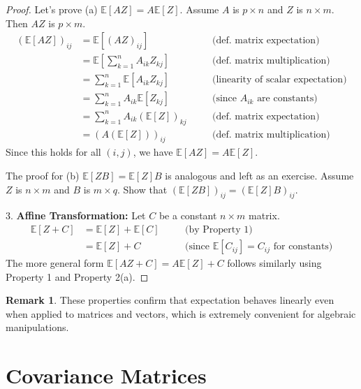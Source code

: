 \documentclass[11pt]{article}
\theoremstyle{definition}
\newtheorem{remark}[theorem]{Remark}
\newcommand{\E}{\mathbb{E}}
\begin{document}
\begin{proof}
    Let's prove (a) $\E[AZ] = A\E[Z]$. Assume $A$ is $p \times n$ and $Z$ is $n \times m$. Then $AZ$ is $p \times m$.
    \begin{align*}
        (\E[AZ])_{ij} &= \E[(AZ)_{ij}] \quad &&\text{(def. matrix expectation)} \\
                      &= \E\left[ \sum_{k=1}^n A_{ik} Z_{kj} \right] \quad &&\text{(def. matrix multiplication)} \\
                      &= \sum_{k=1}^n \E[A_{ik} Z_{kj}] \quad &&\text{(linearity of scalar expectation)} \\
                      &= \sum_{k=1}^n A_{ik} \E[Z_{kj}] \quad &&\text{(since $A_{ik}$ are constants)} \\
                      &= \sum_{k=1}^n A_{ik} (\E[Z])_{kj} \quad &&\text{(def. matrix expectation)} \\
                      &= (A (\E[Z]))_{ij} \quad &&\text{(def. matrix multiplication)}
    \end{align*}
    Since this holds for all $(i,j)$, we have $\E[AZ] = A\E[Z]$.

    The proof for (b) $\E[ZB] = \E[Z]B$ is analogous and left as an exercise. Assume $Z$ is $n \times m$ and $B$ is $m \times q$. Show that $(\E[ZB])_{ij} = (\E[Z]B)_{ij}$.

3.  \textbf{Affine Transformation:} Let $C$ be a constant $n \times m$ matrix.
    \begin{align*}
        \E[Z + C] &= \E[Z] + \E[C] \quad &&\text{(by Property 1)} \\
                   &= \E[Z] + C \quad &&\text{(since $\E[C_{ij}] = C_{ij}$ for constants)}
    \end{align*}
    The more general form $\E[AZ + C] = A \E[Z] + C$ follows similarly using Property 1 and Property 2(a).
\end{proof}

\begin{remark}
These properties confirm that expectation behaves linearly even when applied to matrices and vectors, which is extremely convenient for algebraic manipulations.
\end{remark}

\section{Covariance Matrices}
\end{document}
